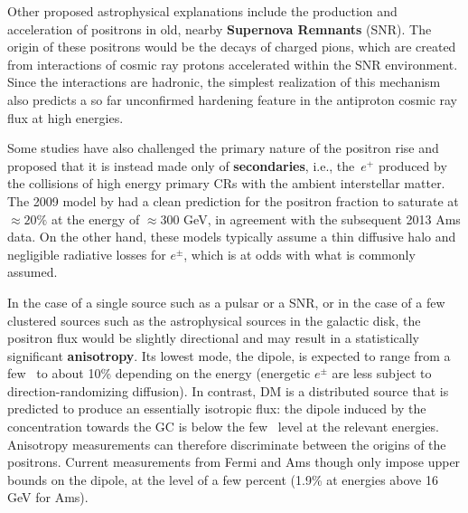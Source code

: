 Other proposed astrophysical explanations include the production and acceleration of positrons in old, nearby {\bf Supernova Remnants} (SNR). 
The origin of these positrons would be the decays of charged pions, which are created from interactions of cosmic ray protons accelerated within the SNR environment. Since the interactions are hadronic, the simplest realization of this mechanism also predicts a so far unconfirmed hardening feature in the antiproton cosmic ray flux at high energies. 


Some studies have also challenged
the primary nature of the positron rise and proposed that it is instead made only of {\bf secondaries}, i.e., the~$e^+$ produced by the collisions of high energy primary CRs with the ambient interstellar matter. 
The 2009 model by  had a clean prediction for the positron fraction to saturate at $\approx 20\%$ at the energy of $\approx 300$ GeV, in  agreement with the subsequent 2013 {\sc Ams} data. 
On the other hand, these models typically assume a thin diffusive halo and negligible radiative losses for $e^\pm$, which is at odds with what is commonly assumed.



\medskip

In the case of a single source such as a pulsar or a SNR, or in the case of a few clustered sources such as the astrophysical sources in the galactic disk, the positron flux would be slightly directional and may result in a statistically significant {\bf anisotropy}. Its lowest mode, the dipole, is expected to range from a few \textperthousand~to about 10\% depending on the energy (energetic $e^\pm$ are less subject to direction-randomizing diffusion). In contrast, DM is a distributed source that is predicted to produce an essentially isotropic flux: the dipole induced by the concentration towards the GC is below the few \textperthousand~level at the relevant energies. Anisotropy measurements can therefore discriminate between the origins of the positrons. Current measurements from {\sc Fermi} \cite{FERMIanisotropy} and {\sc Ams} \cite{AMSpos2019} though only impose upper bounds on the dipole, at the level of a few percent (1.9\% at energies above 16 GeV for {\sc Ams}).




\medskip


